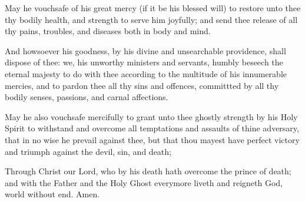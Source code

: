 


\centerline{}

May he %
vouchsafe of his great mercy (if it be his blessed will) to restore unto thee thy bodily health, and strength to serve him joyfully; and send thee release of all thy pains, troubles, and diseases both in body and mind.
\vspace{-1em}
\begin{leftbar}
And howsoever his goodness, by his divine and unsearchable providence, shall dispose of thee: we, his unworthy ministers and servants, humbly beseech the eternal majesty to do with thee according to the multitude of his innumerable mercies, and to pardon thee all thy sins and offences, committted by all thy bodily senses, passions, and carnal affections.
\end{leftbar}

\vspace{-1.7em}

\begin{leftbar}
    May he %
also vouchsafe mercifully to grant unto thee ghostly strength by his Holy Spirit to withstand and overcome all temptations and assaults of thine adversary, that in no wise he prevail against thee, but that thou mayest have perfect victory and triumph against the devil, sin, and death;
\end{leftbar}
\vspace{-1em}

Through Christ our Lord, who by his death hath overcome the prince of death; and with the Father and the Holy Ghost everymore liveth and reigneth God, world without end.  \R Amen.


